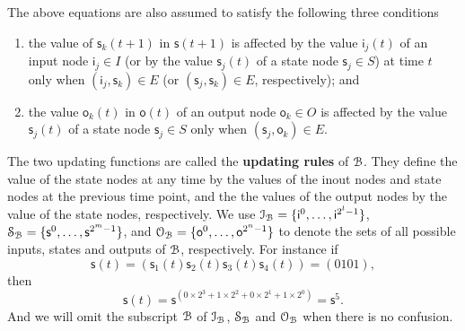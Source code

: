 \begin{definition}
\begin{itemize}
\begin{equation}
\label{equ:1}
\end{equation}
The above equations are also assumed to satisfy the following three conditions
\begin{enumerate}
\item the value of $\mathsf{s}_k(t+1)$ in $\mathsf{s}(t+1)$ is affected by the value  $\mathsf{i}_j(t)$ of an input node $\mathsf{i}_j \in I$ (or by the value $\mathsf{s}_j(t)$ of a state node $\mathsf{s}_j\in S$) at time $t$ only when $(\mathsf{i}_j, \mathsf{s}_k)\in E$ (or $(\mathsf{s}_j, \mathsf{s}_k)\in E$, respectively); and
\item the value $\mathsf{o}_k(t)$ in $\mathsf{o}(t)$ of an output node $\mathsf{o}_k\in O$ is affected by the value $\mathsf{s}_j(t)$ of a state node $\mathsf{s}_j\in S$ only when $(\mathsf{s}_j,\mathsf{o}_k)\in E$.
\end{enumerate}
\end{itemize}

\end{definition}
 The two updating functions are called the  {\bf updating rules}  of ${\mathcal{B}}$. They define the value of the state nodes at any time by the values of the inout nodes and state nodes at the previous time point, and the the values of the output nodes by the value of the state nodes, respectively. We use 
 $\mathcal{I}_{\mathcal{B}}=\{\mathsf{i}^0,\ldots,\mathsf{i}^{2^{l}-1} \}$,
 $\mathcal{S}_{\mathcal{B}}=\{\mathsf{s}^0,\ldots,\mathsf{s}^{2^{m}-1}\}$,
 and $\mathcal{O}_{\mathcal{B}}=\{\mathsf{o}^0,\ldots,\mathsf{o}^{2^{n}-1}\}$ to denote  the sets of all possible inputs, states and outputs of ${\mathcal{B}}$, respectively. For instance if \[\mathsf{s}(t)=(\mathsf{s}_1(t)\mathsf{s}_2(t) \mathsf{s}_3(t) \mathsf{s}_4(t))=(0101),\] then %
 \[\mathsf{s}(t)=\mathsf{s}^{(0\times2^3+1\times2^2+0\times2^1+1\times2^0)}=\mathsf{s}^5.\] And we will omit the subscript ${\mathcal{B}}$ of $\mathcal{I}_{\mathcal{B}}$, $\mathcal{S}_{\mathcal{B}}$ and $\mathcal{O}_{\mathcal{B}}$ when there is no confusion. %


